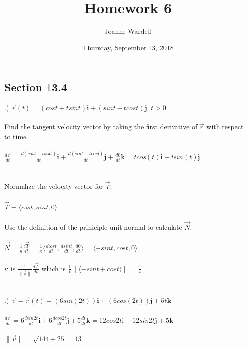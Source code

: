 \documentclass[12pt]{article}
\title{\vspace{-2.0cm}Homework 6}
\author{Joanne Wardell}
\date{Thursday, September 13, 2018}
\begin{document}
\maketitle


\subsection*{Section 13.4}
.) $\vec{r}(t) = (cos{t} + tsin{t})\mathbf{i} + (sin{t} - tcos{t})\mathbf{j}$, \hspace{10pt} $t > 0$\\\\
\noindent Find the tangent velocity vector by taking the first derivative of $\vec{r}$ with respect to time.\\\\
\noindent $\frac{d\vec{r}}{dt} = \frac{d(cos{t} + tsin{t})}{dt}\mathbf{i} + \frac{d(sin{t} - tcos{t})}{dt}\mathbf{j} + \frac{d0}{dt}\mathbf{k}= tcos(t)\mathbf{i} + tsin(t)\mathbf{j}$\\\\\\
\noindent Normalize the velocity vector for $\vec{T}$. \\\\
\noindent $\vec{T} = \langle cos{t}, sin{t}, 0\rangle$\\\\
\noindent Use the definition of the priniciple unit normal to calculate $\vec{N}$.\\\\
\noindent $\vec{N} = \frac{1}{\kappa}\frac{d\vec{T}}{dt} = \frac{1}{\kappa}\langle \frac{dcos{t}}{dt}, \frac{dsin{t}}{dt} , \frac{d0}{dt}\rangle = \langle -sin{t}, cos{t}, 0\rangle$\\\\
\noindent $\kappa$ is $\frac{1}{\| \vec{v} \|}\frac{d\vec{T}}{dt}$ which is $ \frac{1}{t} \|\langle -sin{t} + cos{t} \rangle \| = \frac{1}{t}$\\\\\\
.) $\vec{v} =\vec{r}(t) = (6sin(2t))\mathbf{i} + (6cos(2t))\mathbf{j} + 5t\mathbf{k}$\\\\
\noindent $\frac{d\vec{r}}{dt} = 6\frac{dsin{2t}}{dt}\mathbf{i} + 6\frac{dcos{2t}}{dt}\mathbf{j} + 5\frac{dt}{dt}\mathbf{k} =
12cos{2t}\mathbf{i} - 12sin{2t}\mathbf{j} + 5\mathbf{k}$\\\\
\noindent $\| \vec{v} \| = \sqrt{144 + 25} = 13 $\\\\
\end{document}
